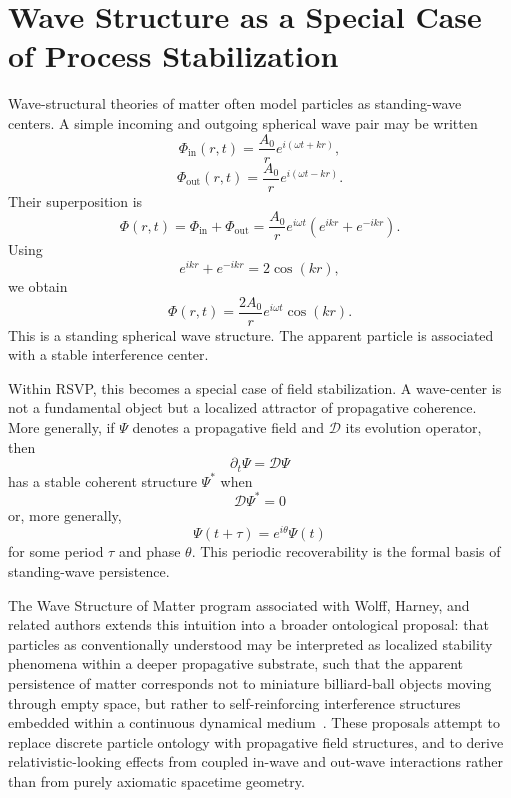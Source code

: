 \documentclass[12pt,a4paper]{article}
\begin{document}
\section{Wave Structure as a Special Case of Process Stabilization}

Wave-structural theories of matter often model particles as standing-wave centers. A simple incoming and outgoing spherical wave pair may be written
\[
\Phi_{\mathrm{in}}(r,t)=\frac{A_0}{r}e^{i(\omega t+kr)},
\]
\[
\Phi_{\mathrm{out}}(r,t)=\frac{A_0}{r}e^{i(\omega t-kr)}.
\]
Their superposition is
\[
\Phi(r,t)
=
\Phi_{\mathrm{in}}+\Phi_{\mathrm{out}}
=
\frac{A_0}{r}e^{i\omega t}
\left(e^{ikr}+e^{-ikr}\right).
\]
Using
\[
e^{ikr}+e^{-ikr}=2\cos(kr),
\]
we obtain
\[
\Phi(r,t)=\frac{2A_0}{r}e^{i\omega t}\cos(kr).
\]
This is a standing spherical wave structure. The apparent particle is associated with a stable interference center.

Within RSVP, this becomes a special case of field stabilization. A wave-center is not a fundamental object but a localized attractor of propagative coherence. More generally, if \(\Psi\) denotes a propagative field and \(\mathcal{D}\) its evolution operator, then
\[
\partial_t \Psi = \mathcal{D}\Psi
\]
has a stable coherent structure \(\Psi^\ast\) when
\[
\mathcal{D}\Psi^\ast = 0
\]
or, more generally,
\[
\Psi(t+\tau)=e^{i\theta}\Psi(t)
\]
for some period \(\tau\) and phase \(\theta\). This periodic recoverability is the formal basis of standing-wave persistence.

The Wave Structure of Matter program associated with Wolff, Harney, and related authors extends this intuition into a broader ontological proposal: that particles as conventionally understood may be interpreted as localized stability phenomena within a deeper propagative substrate, such that the apparent persistence of matter corresponds not to miniature billiard-ball objects moving through empty space, but rather to self-reinforcing interference structures embedded within a continuous dynamical medium~\cite{wolff1986,wolff1990,harney2007,harney2020,weber2007}. These proposals attempt to replace discrete particle ontology with propagative field structures, and to derive relativistic-looking effects from coupled in-wave and out-wave interactions rather than from purely axiomatic spacetime geometry.
\end{document}
